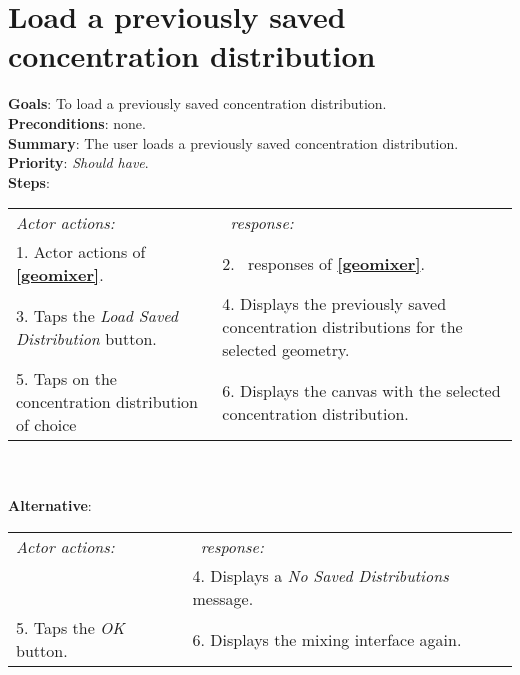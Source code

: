   \section{Load a previously saved concentration distribution}
  \label{loadsavedist}
  \textbf{Goals}: To load a previously saved concentration distribution.\\
  \textbf{Preconditions}: none.\\
  \textbf{Summary}: The user loads a previously saved concentration distribution.\\
  \textbf{Priority}: \emph{Should have}.\\
  \textbf{Steps}: \\
  \begin{tabular}{ p{} p{} }
  	\emph{Actor actions:} & \emph{\projectname\ response:} \\
  	1. Actor actions of \textbf{\ref{geomixer}}. & 2. \projectname\ responses of \textbf{\ref{geomixer}}. \\
	3. Taps the \emph{Load Saved Distribution} button. & 4. Displays the previously saved concentration distributions for the selected geometry. \\
	5. Taps on the concentration distribution of choice & 6. Displays the canvas with the selected concentration distribution. \\
	\end{tabular}
	        \\
     \\\textbf{Alternative}: \\
    \begin{tabular}{ p{} p{} }
  	\emph{Actor actions:} & \emph{\projectname\ response:} \\
            & 4. Displays a \emph{No Saved Distributions} message. \\
    5. Taps the \emph{OK} button. & 6. Displays the mixing interface again. \\
  \end{tabular}

